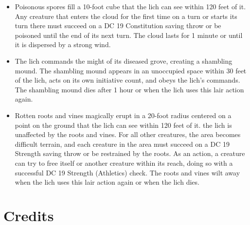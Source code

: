 \documentclass[10pt,a4paper,twoside,bg=print,twocolumn,openany,nodeprecatedcode]{dndbook}
\begin{document}
\begin{itemize}
\item Poisonous spores fill a 10-foot cube that the lich can see within 120 feet of it. Any creature that enters the cloud for the first time on a turn or starts its turn there must succeed on a DC 19 Constitution saving throw or be poisoned until the end of its next turn. The cloud lasts for 1 minute or until it is dispersed by a strong wind.
\item The lich commands the might of its diseased grove, creating a shambling mound. The shambling mound appears in an unoccupied space within 30 feet of the lich, acts on its own initiative count, and obeys the lich's commands. The shambling mound dies after 1 hour or when the lich uses this lair action again.
\item Rotten roots and vines magically erupt in a 20-foot radius centered on a point on the ground that the lich can see within 120 feet of it. the lich is unaffected by the roots and vines. For all other creatures, the area becomes difficult terrain, and each creature in the area must succeed on a DC 19 Strength saving throw or be restrained by the roots. As an action, a creature can try to free itself or another creature within its reach, doing so with a successful DC 19 Strength (Athletics) check. The roots and vines wilt away when the lich uses this lair action again or when the lich dies.
\end{itemize}

\chapter{Credits}
\end{document}
